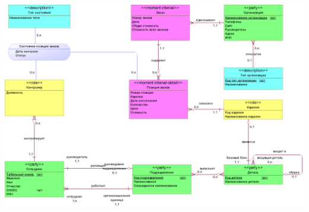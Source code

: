 \documentclass{beamer}
\begin{document}
\begin{frame}
\begin{center}
\includegraphics[scale=0.22]{images/lec03-pic01.png}
\end{center}
\end{frame}
\end{document}
